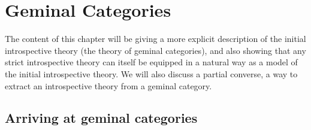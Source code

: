 \section{Geminal Categories}

The content of this chapter will be giving a more explicit description of the initial introspective theory (the theory of geminal categories), and also showing that any strict introspective theory can itself be equipped in a natural way as a model of the initial introspective theory. We will also discuss a partial converse, a way to extract an introspective theory from a geminal category.

\subsection{Arriving at geminal categories}
